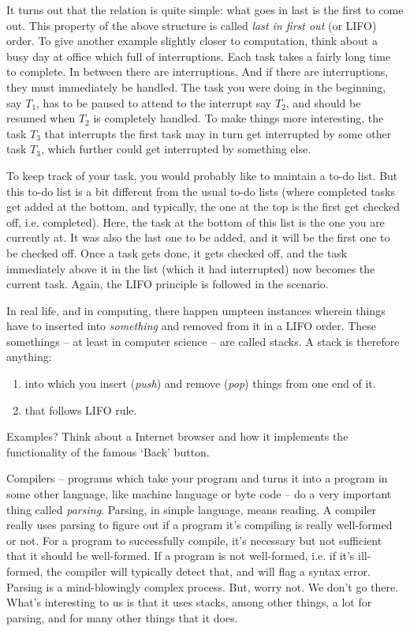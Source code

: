 \documentclass[12pt,a4paper]{article}
\begin{document}
It turns out that the relation is quite simple: what goes in last is the first to come out. This property of the above structure is called \emph{last in first out} (or LIFO) order. To give another example slightly closer to computation, think about a busy day at office which full of interruptions. Each task takes a fairly long time to complete. In between there are interruptions. And if there are interruptions, they must immediately be handled. The task you were doing in the beginning, say $T_1$, has to be paused to attend to the interrupt say $T_2$, and should be resumed when $T_2$ is completely handled. To make things more interesting, the task $T_3$ that interrupts the first task may in turn get interrupted by some other task $T_3$, which further could get interrupted by something else.

To keep track of your task, you would probably like to maintain a to-do list. But this to-do list is a bit different from the usual to-do lists (where completed tasks get added at the bottom, and typically, the one at the top is the first get checked off, i.e. completed). Here, the task at the bottom of this list is the one you are currently at. It was also the last one to be added, and it will be the first one to be checked off. Once a task gets done, it gets checked off, and the task immediately above it in the list (which it had interrupted) now becomes the current task. Again, the LIFO principle is followed in the scenario.

In real life, and in computing, there happen umpteen instances wherein things have to inserted into \emph{something} and removed from it in a LIFO order. These somethings -- at least in computer science -- are called stacks. A stack is therefore anything:
\begin{enumerate}
\item into which you insert (\emph{push}) and remove (\emph{pop}) things from one end of it.
\item that follows LIFO rule.
\end{enumerate}

Examples? Think about a Internet browser and how it implements the functionality of the famous `Back' button.

Compilers -- programs which take your program and turns it into a program in some other language, like machine language or byte code -- do a very important thing called \emph{parsing}. Parsing, in simple language, means reading. A compiler really uses parsing to figure out if a program it's compiling is really well-formed or not. For a program to successfully compile, it's necessary but not sufficient that it should be well-formed. If a program is not well-formed, i.e. if it's ill-formed, the compiler will typically detect that, and will flag a syntax error. Parsing is a mind-blowingly complex process. But, worry not. We don't go there. What's interesting to us is that it uses stacks, among other things, a lot for parsing, and for many other things that it does.
\end{document}
